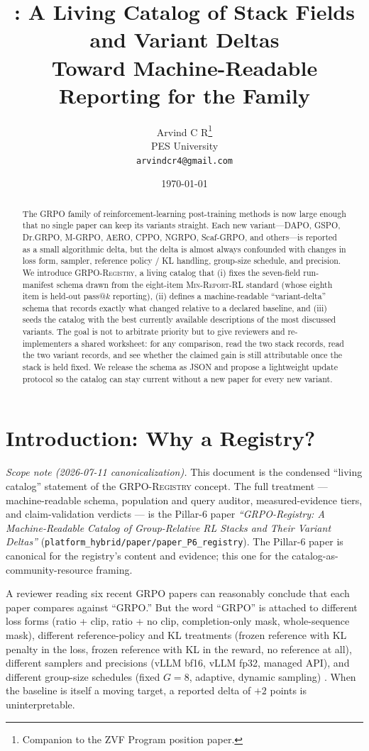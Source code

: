 \documentclass[11pt]{article}
\title{\grpoReg{}: A Living Catalog of Stack Fields and Variant Deltas\\
\large Toward Machine-Readable Reporting for the \grpo{} Family}
\author{Arvind C R\thanks{Companion to the ZVF Program \minreport{} position
paper.}\\PES University\\\texttt{arvindcr4@gmail.com}}
\date{\today}
\newcommand{\minreport}{\textsc{Min-Report-RL}}
\newcommand{\grpo}{\textsc{GRPO}}
\newcommand{\grpoReg}{\textsc{GRPO-Registry}}
\begin{document}
\maketitle

\begin{abstract}
The \grpo{} family of reinforcement-learning post-training methods is now
large enough that no single paper can keep its variants straight. Each new
variant---DAPO, GSPO, Dr.\grpo{}, M-\grpo{}, AERO, CPPO, NGRPO,
Scaf-\grpo{}, and others---is reported as a small algorithmic delta, but the
delta is almost always confounded with changes in loss form, sampler, reference
policy / KL handling, group-size schedule, and precision. We introduce
\grpoReg{}, a living catalog that (i) fixes the seven-field run-manifest
schema drawn from the eight-item \minreport{} standard (whose eighth item is
held-out pass@$k$ reporting), (ii)
defines a machine-readable ``variant-delta'' schema that records exactly what
changed relative to a declared baseline, and (iii) seeds the catalog with the
best currently available descriptions of the most discussed variants. The goal
is not to arbitrate priority but to give reviewers and re-implementers a shared
worksheet: for any comparison, read the two stack records, read the two variant
records, and see whether the claimed gain is still attributable once the stack
is held fixed. We release the schema as JSON and propose a lightweight
update protocol so the catalog can stay current without a new paper for every
new variant.
\end{abstract}

\section{Introduction: Why a Registry?}
\label{sec:intro}


\noindent\emph{Scope note (2026-07-11 canonicalization).} This document is
the condensed ``living catalog'' statement of the \grpoReg{} concept. The
full treatment --- machine-readable schema, population and query auditor,
measured-evidence tiers, and claim-validation verdicts --- is the Pillar-6
paper \emph{``GRPO-Registry: A Machine-Readable Catalog of Group-Relative
RL Stacks and Their Variant Deltas''}
(\texttt{platform\_hybrid/paper/paper\_P6\_registry}). The Pillar-6 paper
is canonical for the registry's content and evidence; this one for the
catalog-as-community-resource framing.

A reviewer reading six recent \grpo{} papers can reasonably conclude that each
paper compares against ``GRPO.'' But the word ``GRPO'' is attached to different
loss forms (ratio + clip, ratio + no clip, completion-only mask,
whole-sequence mask), different reference-policy and KL treatments (frozen
reference with KL penalty in the loss, frozen reference with KL in the reward,
no reference at all), different samplers and precisions (vLLM bf16, vLLM fp32,
managed API), and different group-size schedules (fixed $G=8$, adaptive,
dynamic sampling) \cite{zvfaudit2026,yu2025dapo,qwen2025gspo,tong2025drgrpo,
hong2025mgrpo}. When the baseline is itself a moving target, a reported delta of
$+2$ points is uninterpretable.
\end{document}
